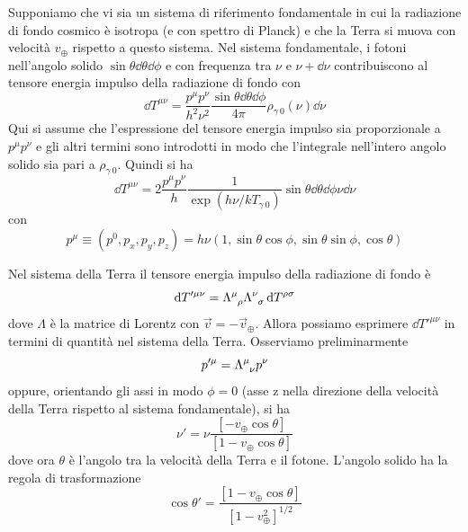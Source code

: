 Supponiamo che vi sia un sistema di riferimento fondamentale in cui la
radiazione di fondo cosmico è isotropa (e con spettro di Planck) e che la Terra
si muova con velocità $v_{\oplus}$ rispetto a questo sistema.  Nel sistema
fondamentale, i fotoni nell'angolo solido $\sin \theta \dd\theta \dd\phi$ e con
frequenza tra $\nu$ e $\nu + \dd\nu$ contribuiscono al tensore energia impulso
della radiazione di fondo con
\begin{equation}
  \dd T^{\mu \nu}= \frac{p^{\mu} p^{\nu}}{h^2 \nu^2}
  \frac{\sin \theta \dd\theta \dd\phi}{4 \pi}
  \rho_{\gamma ~ 0}(\nu) \dd\nu
\end{equation}
Qui si assume che l'espressione del tensore energia impulso sia proporzionale a
$p^{\mu} p^{\nu}$ e gli altri termini sono introdotti in modo che l'integrale
nell'intero angolo solido sia pari a $\rho_{\gamma ~0}$.  Quindi si ha
\begin{equation}
  \dd T^{\mu \nu}= 2 \frac{ p^{\mu} p^{\nu} }{h} \frac{1}{\exp (h \nu/ kT_{\gamma ~ 0 })}
  \sin \theta \dd\theta \dd\phi \nu \dd\nu
\end{equation}
con
\begin{equation}
  p^{\mu} \equiv (p^0, p_x, p_y, p_z) =
  h \nu ( 1, \sin\theta \cos\phi , \sin\theta \sin\phi, \cos\theta)
\end{equation}

Nel sistema della Terra il tensore energia impulso della radiazione di fondo è
\begin{equation}
  \dd T'^{\mu \nu} = \tensor{\Lambda}{^{\mu}_{\rho}} \tensor{\Lambda}{^{\nu}_{\sigma}}
  \dd T^{\rho\sigma} 
\end{equation}
dove $\Lambda$ è la matrice di Lorentz con $\vec{v} = - \vec{v}_{\oplus}$.
Allora possiamo esprimere $\dd T'^{\mu \nu}$ in termini di quantità nel sistema
della Terra.  Osserviamo preliminarmente
\begin{equation}
  p'^{\mu } = \tensor{\Lambda}{^{\mu}_{\nu}} p^{\nu}
\end{equation}
oppure, orientando gli assi in modo $\phi=0$ (asse z nella direzione della
velocità della Terra rispetto al sistema fondamentale), si ha
\begin{equation}
  \nu' = \nu \frac{[-v_{\oplus}\cos\theta]}{[ 1 - v_{\oplus} \cos\theta]}
\end{equation}
dove ora $\theta$ è l'angolo tra la velocità della Terra e il fotone.  L'angolo
solido ha la regola di trasformazione
\begin{equation}
  \cos \theta' = \frac{[1- v_{\oplus} \cos \theta]}{[1 - v_{\oplus}^2 ]^{1/2}}
\end{equation}

